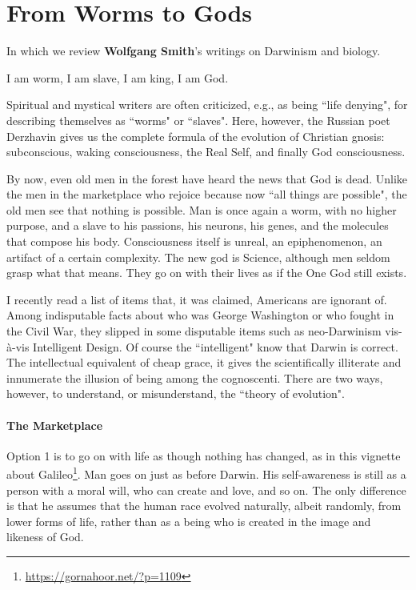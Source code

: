 \section{From Worms to Gods}

In which we review \textbf{Wolfgang Smith}'s writings on Darwinism and biology. 

\begin{quotex}
I am worm, I am slave, I am king, I am God. 

\end{quotex}
Spiritual and mystical writers are often criticized, e.g., as being ``life denying", for describing themselves as ``worms" or ``slaves". Here, however, the Russian poet Derzhavin gives us the complete formula of the evolution of Christian gnosis: subconscious, waking consciousness, the Real Self, and finally God consciousness.

By now, even old men in the forest have heard the news that God is dead. Unlike the men in the marketplace who rejoice because now ``all things are possible", the old men see that nothing is possible. Man is once again a worm, with no higher purpose, and a slave to his passions, his neurons, his genes, and the molecules that compose his body. Consciousness itself is unreal, an epiphenomenon, an artifact of a certain complexity. The new god is Science, although men seldom grasp what that means. They go on with their lives as if the One God still exists.

I recently read a list of items that, it was claimed, Americans are ignorant of. Among indisputable facts about who was George Washington or who fought in the Civil War, they slipped in some disputable items such as neo-Darwinism vis-à-vis Intelligent Design. Of course the ``intelligent" know that Darwin is correct. The intellectual equivalent of cheap grace, it gives the scientifically illiterate and innumerate the illusion of being among the cognoscenti. There are two ways, however, to understand, or misunderstand, the ``theory of evolution".

\paragraph{The Marketplace}
Option 1 is to go on with life as though nothing has changed, as in this vignette about Galileo\footnote{\url{https://gornahoor.net/?p=1109}}. Man goes on just as before Darwin. His self-awareness is still as a person with a moral will, who can create and love, and so on. The only difference is that he assumes that the human race evolved naturally, albeit randomly, from lower forms of life, rather than as a being who is created in the image and likeness of God.

